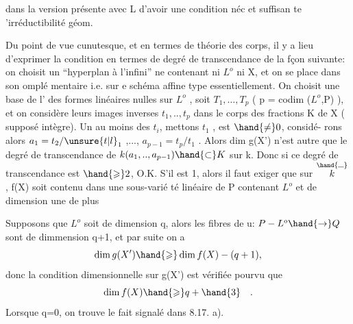 
dans la version présente  avec L d'avoir une condition néc et suffisan%
te 'irréductibilité géom. 

Du point de vue cunutesque,  et en termes de théorie des
corps, il y a lieu d'exprimer la condition  en termes de
degré de transcendance de la fçon suivante: on choisit un ``hyperplan
à l'infini'' ne contenant ni $L^{o}$ ni X, et on se place dans son omplé%
mentaire i.e. sur e schéma affine  type essentiellement. On choisit
une base de l' des formes linéaires nulles sur $L^{o}$ , 
 soit $T_{1},\ldots,T_{p}$ ( p = codim ($L^{o}$,P) ), et on considère
leurs images inverses $t_{1},..,t_{p}$ dans le corps des fractions K de X
( supposé intègre). Un au moins des $t_{i}$, mettons $t_{1}$ , est $\hand{\neq} 0$, considé-%
rons alors $a_{1} = t_{2}/\unsure{t|l}_{1}$ ,..., $a_{p-1} = t_{p}/t_{1}$ . Alors dim g(X') n'est
autre que le degré de transcendance de $k(a_{1},..,a_{p-1}) \hand{\subset} K$ sur k. Donc
si ce degré de transcendance est $\hand{\geqslant} 2$, O.K.  S'il est 1,
alors il faut exiger que sur $\overset{\hand{\rule{0.6em}{0.35pt}}}{k}$ , f(X) soit contenu dans une sous-varié%
té linéaire de P contenant $L^{o}$ et de dimension une de plus

Supposons que $L^{o}$ soit de dimension q, alors les fibres de u:
$P - L^{o} \hand{\to} Q$ sont de dimmension q+1,  et par suite on a
\[ \dim g(X') \hand{\geqslant} \dim f(X) - (q+1) , \]
donc la condition dimensionnelle sur g(X') est vérifiée pourvu que
\[ \dim f(X) \hand{\geqslant} q+\hand{3} \quad . \]
Lorsque q=0, on trouve le fait signalé dans 8.17. a).  

